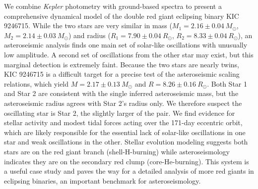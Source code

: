 We combine \emph{Kepler} photometry with ground-based spectra to present a comprehensive dynamical model of the double red giant eclipsing binary KIC 9246715. While the two stars are very similar in mass ($M_1 = 2.16 \pm 0.04\ M_{\odot}$, $M_2 = 2.14 \pm 0.03\ M_{\odot}$) and radius ($R_1 = 7.90 \pm 0.04 \ R_{\odot}$, $R_2 = 8.33 \pm 0.04 \ R_{\odot}$), an asteroseismic analysis finds one main set of solar-like oscillations with unusually low amplitude. A second set of oscillations from the other star may exist, but this marginal detection is extremely faint. Because the two stars are nearly twins, KIC 9246715 is a difficult target for a precise test of the asteroseismic scaling relations, which yield $M = 2.17 \pm 0.13 \ M_{\odot}$ and $R = 8.26 \pm 0.16 \ R_{\odot}$. Both Star 1 and Star 2 are consistent with the single inferred asteroseismic mass, but the asteroseismic radius agrees with Star 2's radius only. We therefore suspect the oscillating star is Star 2, the slightly larger of the pair. We find evidence for stellar activity and modest tidal forces acting over the 171-day eccentric orbit, which are likely responsible for the essential lack of solar-like oscillations in one star and weak oscillations in the other. Stellar evolution modeling suggests both stars are on the red giant branch (shell-H-burning) while asteroseismology indicates they are on the secondary red clump (core-He-burning). This system is a useful case study and paves the way for a detailed analysis of more red giants in eclipsing binaries, an important benchmark for asteroseismology.
  
  
  
  